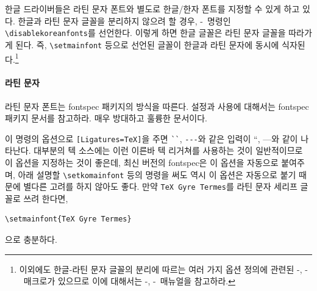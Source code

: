 \documentclass[
	12pt,
	a4paper,
	kosection,
	footnote,
	microtype,
	figtabcapt,
]{oblivoir}
\def\cs#1{\texttt{\textbackslash #1}}
\def\ct#1{\texttt{#1}}
\def\xetexko{\XeTeX-\ko}
\def\luatexko{\LuaTeX-\ko}
\begin{document}
한글 드라이버들은 라틴 문자 폰트와 별도로 한글/한자 폰트를 지정할 수 있게 하고 있다.
한글과 라틴 문자 글꼴을 분리하지 않으려 할 경우, 
\xetexko\ 명령인
\verb|\disablekoreanfonts|를 선언한다.
이렇게 하면 한글 글꼴은
라틴 문자 글꼴을 따라가게 된다. 즉, \texttt{\textbackslash setmainfont}
등으로 선언된 글꼴이 한글과 라틴 문자에 동시에 식자된다.\footnote{%
 이외에도 한글-라틴 문자 글꼴의 분리에 따르는 여러 가지 옵션 정의에 관련된
 \xetexko, \luatexko\ 매크로가 있으므로 이에 대해서는 \xetexko, \luatexko\ 매뉴얼을
 참고하라.
}

\paragraph{라틴 문자}
라틴 문자 폰트는 fontspec 패키지의 방식을 따른다.
설정과 사용에 대해서는 fontspec 패키지 문서를 참고하라.
매우 방대하고 훌륭한 문서이다.

\begin{boxedverbatim}
\setmainfont{<Font Name>}
\setsansfont{...}
\setmonofont{...}
\end{boxedverbatim}

이 명령의 옵션으로 \verb|[Ligatures=TeX]|을 주면 \verb|``|, \verb|---|와 같은 
입력이 ``, ---와 같이 나타난다. 대부분의 텍 소스에는 이런 이른바 텍 리거쳐를 사용하는 것이
일반적이므로 이 옵션을 지정하는 것이 좋은데, 최신 버전의 fontspec은 이 옵션을 자동으로 붙여주며,
아래 설명할 \cs{setkomainfont} 등의 명령을 써도 역시 이 옵션은 자동으로 붙기 때문에 별다른 고려를 하지 않아도 좋다.
만약 \ct{TeX Gyre Termes}를 라틴 문자 세리프 글꼴로 쓰려 한다면,
\begin{verbatim}
\setmainfont{TeX Gyre Termes}
\end{verbatim}
으로 충분하다.
\end{document}
